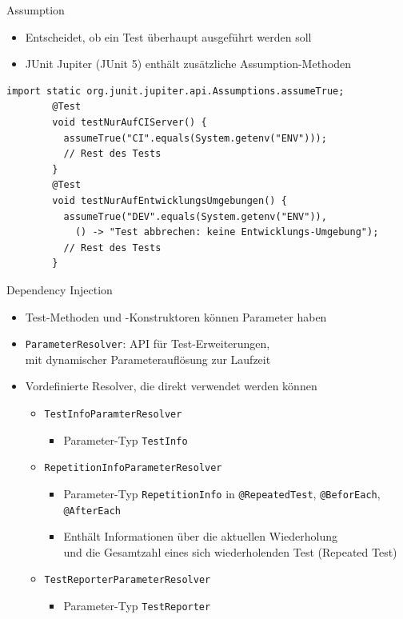 \documentclass[utf8,t,aspectratio=169]{beamer}
\begin{document}
    \begin{frame}[fragile]{Assumption}
      \begin{itemize}
        \item Entscheidet, ob ein Test überhaupt ausgeführt werden soll
        \item JUnit Jupiter (JUnit 5) enthält zusätzliche Assumption-Methoden
      \end{itemize}
      \begin{lstlisting}[gobble=8]
        import static org.junit.jupiter.api.Assumptions.assumeTrue;
        @Test
        void testNurAufCIServer() {
          assumeTrue("CI".equals(System.getenv("ENV")));
          // Rest des Tests
        }
        @Test
        void testNurAufEntwicklungsUmgebungen() {
          assumeTrue("DEV".equals(System.getenv("ENV")),
            () -> "Test abbrechen: keine Entwicklungs-Umgebung");
          // Rest des Tests
        }
      \end{lstlisting}
    \end{frame}
    \begin{frame}{Dependency Injection}
      \begin{itemize}
        \item Test-Methoden und -Konstruktoren können Parameter haben
        \item \lstinline|ParameterResolver|: API für Test-Erweiterungen,\\
          mit dynamischer Parameterauflösung zur Laufzeit
        \item Vordefinierte Resolver, die direkt verwendet werden können
          \begin{itemize}
            \item \lstinline|TestInfoParamterResolver|
                \begin{itemize}
                  \item Parameter-Typ \lstinline|TestInfo|
                \end{itemize}
              \item \lstinline|RepetitionInfoParameterResolver|
                \begin{itemize}
                  \item Parameter-Typ \lstinline|RepetitionInfo| in
                    \lstinline|@RepeatedTest|, \lstinline|@BeforEach|,
                    \lstinline|@AfterEach|
                  \item Enthält Informationen über die aktuellen Wiederholung\\
                    und die Gesamtzahl eines sich wiederholenden Test (Repeated
                    Test)
                \end{itemize}
              \item \lstinline|TestReporterParameterResolver|
                \begin{itemize}
                  \item Parameter-Typ \lstinline|TestReporter|
                \end{itemize}
          \end{itemize}
      \end{itemize}
    \end{frame}
\end{document}
